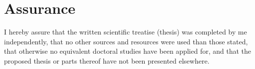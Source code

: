 \chapter{Assurance}

I hereby assure that the written scientific treatise (thesis) was completed by me independently, that no other sources and resources were used than those stated, that otherwise no equivalent doctoral studies have been applied for, and that the proposed thesis or parts thereof have not been presented elsewhere.